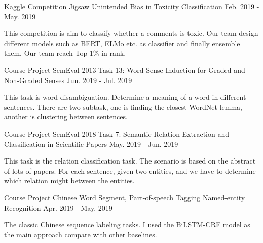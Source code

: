 \begin{cventries}
  \cventry
    {Kaggle Competition} %
    {Jigsaw Unintended Bias in Toxicity Classification} %
    {} %
    {Feb. 2019 - May. 2019} %
    {
      \begin{cvitems} %
        \item {This competition is aim to classify whether a comments is toxic. Our team design different models such as BERT, ELMo etc. as classifier and finally ensemble them. Our team reach Top 1\% in rank.}
      \end{cvitems}
    }

  \cventry
    {Course Project} %
    {SemEval-2013 Task 13: Word Sense Induction for Graded and Non-Graded Senses} %
    {} %
    {Jun. 2019 - Jul. 2019} %
    {
      \begin{cvitems} %
        \item {This task is word disambiguation. Determine a meaning of a word in different sentences. There are two subtask, one is finding the closest WordNet lemma, another is clustering between sentences.}
      \end{cvitems}
    }

  \cventry
    {Course Project} %
    {SemEval-2018 Task 7: Semantic Relation Extraction and Classification in Scientific Papers} %
    {} %
    {May. 2019 - Jun. 2019} %
    {
      \begin{cvitems} %
        \item {This task is the relation classification task. The scenario is based on the abstract of lots of papers. For each sentence, given two entities, and we have to determine which relation might between the entities.}
      \end{cvitems}
    }

  \cventry
    {Course Project} %
    {Chinese Word Segment, Part-of-speech Tagging Named-entity Recognition} %
    {} %
    {Apr. 2019 - May. 2019} %
    {
      \begin{cvitems} %
        \item {The classic Chinese sequence labeling tasks. I used the BiLSTM-CRF model as the main approach compare with other baselines.}
      \end{cvitems}
    }


\end{cventries}
